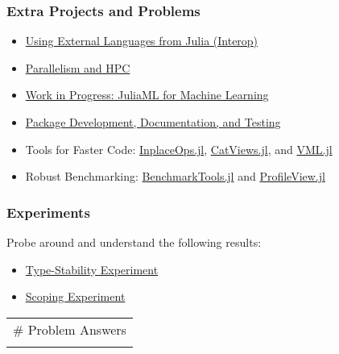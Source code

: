 \documentclass[11pt]{article}
\begin{document}
\subsubsection{Extra Projects and
Problems}\label{extra-projects-and-problems}

\begin{itemize}
\itemsep1pt\parskip0pt
\item
  \href{http://ucidatascienceinitiative.github.io/IntroToJulia/Html/Interop}{Using
  External Languages from Julia (Interop)}
\item
  \href{http://ucidatascienceinitiative.github.io/IntroToJulia/Html/HPCJulia}{Parallelism
  and HPC}
\item
  \href{http://ucidatascienceinitiative.github.io/IntroToJulia/Html/JuliaML}{Work
  in Progress: JuliaML for Machine Learning}
\item
  \href{http://ucidatascienceinitiative.github.io/IntroToJulia/Html/PackageDevelopment}{Package
  Development, Documentation, and Testing}
\item
  Tools for Faster Code:
  \href{https://github.com/simonbyrne/InplaceOps.jl}{InplaceOps.jl},
  \href{https://github.com/ahwillia/CatViews.jl}{CatViews.jl}, and
  \href{https://github.com/JuliaMath/VML.jl}{VML.jl}
\item
  Robust Benchmarking:
  \href{https://github.com/JuliaCI/BenchmarkTools.jl}{BenchmarkTools.jl}
  and \href{https://github.com/timholy/ProfileView.jl}{ProfileView.jl}
\end{itemize}

\subsubsection{Experiments}\label{experiments}

Probe around and understand the following results:

\begin{itemize}
\itemsep1pt\parskip0pt
\item
  \href{http://ucidatascienceinitiative.github.io/IntroToJulia/Html/TypeStabilityExperiment}{Type-Stability
  Experiment}
\item
  \href{http://ucidatascienceinitiative.github.io/IntroToJulia/Html/ScopingExperiment}{Scoping
  Experiment}
\end{itemize}

    \begin{longtable}[c]{@{}l@{}}
\toprule\addlinespace
\# Problem Answers
\\\addlinespace
\bottomrule
\end{longtable}
\end{document}
